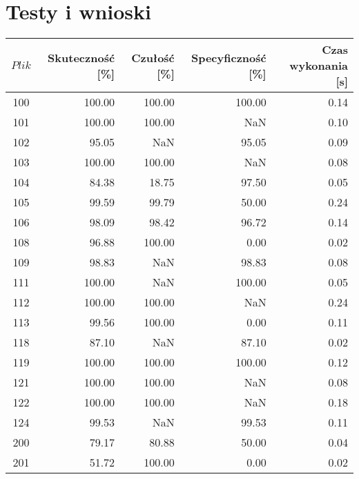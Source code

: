 \section{Testy i wnioski}
\label{sec_testy}

\begin{table}
	\centering
	\begin{tabular}{|c|r|r|r|r|}
		\hline
		$Plik$ & Skuteczność [\%] & Czułość [\%] & Specyficzność [\%] & Czas wykonania [s] \\
		\hline
		100 & 100.00     & 100.00     & 100.00     & 0.14       \\
		\hline
		101 & 100.00     & 100.00     & NaN        & 0.10       \\
		\hline
		102 & 95.05      & NaN        & 95.05      & 0.09       \\
		\hline
		103 & 100.00     & 100.00     & NaN        & 0.08       \\
		\hline
		104 & 84.38      & 18.75      & 97.50      & 0.05       \\
		\hline
		105 & 99.59      & 99.79      & 50.00      & 0.24       \\
		\hline
		106 & 98.09      & 98.42      & 96.72      & 0.14       \\
		\hline
		108 & 96.88      & 100.00     & 0.00       & 0.02       \\
		\hline
		109 & 98.83      & NaN        & 98.83      & 0.08       \\
		\hline
		111 & 100.00     & NaN        & 100.00     & 0.05       \\
		\hline
		112 & 100.00     & 100.00     & NaN        & 0.24       \\
		\hline
		113 & 99.56      & 100.00     & 0.00       & 0.11       \\
		\hline
		118 & 87.10      & NaN        & 87.10      & 0.02       \\
		\hline
		119 & 100.00     & 100.00     & 100.00     & 0.12       \\
		\hline
		121 & 100.00     & 100.00     & NaN        & 0.08       \\
		\hline
		122 & 100.00     & 100.00     & NaN        & 0.18       \\
		\hline
		124 & 99.53      & NaN        & 99.53      & 0.11       \\
		\hline
		200 & 79.17      & 80.88      & 50.00      & 0.04       \\
		\hline
		201 & 51.72      & 100.00     & 0.00       & 0.02       \\

\end{tabular}
\end{table}
